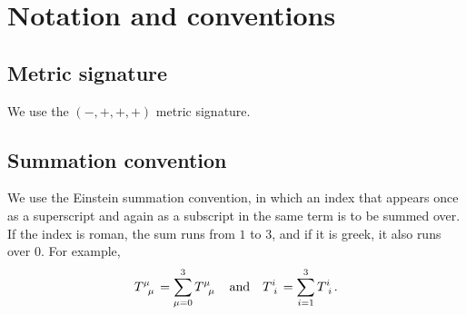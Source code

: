 \chapter*{Notation and conventions} %

\section*{Metric signature}

We use the $(-,+,+,+)$ metric signature.

\section*{Summation convention}

We use the Einstein summation convention, in which an index that appears once as a superscript and again as a subscript in the same term is to be summed over.
If the index is roman, the sum runs from $1$ to $3$, and if it is greek, it also runs over $0$.
For example,
\begin{equation*}
	T\indices{^\mu_\mu} = \sum_{\mu=0}^3 T\indices{^\mu_\mu}
	\quad \text{and} \quad
	T\indices{^i_i} = \sum_{i=1}^3 T\indices{^i_i}
	.
\end{equation*}
